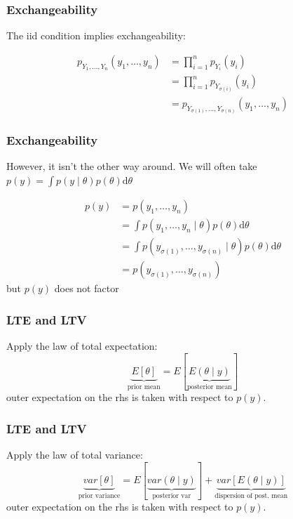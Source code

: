\documentclass{beamer}
\begin{document}
\begin{frame}
\frametitle{Exchangeability}

The iid condition implies exchangeability:

\begin{align*}
p_{Y_1, \ldots, Y_n}(y_1, \ldots, y_n) &= \prod_{i=1}^n p_{Y_i}(y_i) \tag{indep.} \\
&= \prod_{i=1}^n p_{Y_{\sigma(i)}}(y_i) \tag{ident.} \\
&= p_{Y_{\sigma(1)}, \ldots, Y_{\sigma(n)}}(y_1, \ldots, y_n)
\end{align*}

\end{frame}


\begin{frame}
\frametitle{Exchangeability}

However, it isn't the other way around. We will often take $p(y) = \int p(y \mid \theta) p(\theta) \text{d}\theta$

\begin{align*}
p(y) &= p(y_1, \ldots, y_n) \\
&= \int p(y_1, \ldots, y_n \mid \theta) p(\theta) \text{d}\theta \\
&= \int p(y_{\sigma(1)}, \ldots, y_{\sigma(n)} \mid \theta) p(\theta) \text{d}\theta \\
&= p(y_{\sigma(1)}, \ldots, y_{\sigma(n)})
\end{align*}
 but $p(y)$ does not factor

\end{frame}

\begin{frame}
\frametitle{LTE and LTV}

Apply the law of total expectation:
\[
\underbrace{E[\theta]}_{\text{prior mean}} = E[\underbrace{E(\theta \mid y)}_{\text{posterior mean}}]
\]
outer expectation on the rhs is taken with respect to $p(y)$.

\end{frame}


\begin{frame}
\frametitle{LTE and LTV}

Apply the law of total variance:
\[
\underbrace{var[\theta]}_{\text{prior variance}} = E[\underbrace{var(\theta \mid y)}_{\text{posterior var}}] + \underbrace{var[E(\theta \mid y)]}_{\text{dispersion of post. mean}}
\]
outer expectation on the rhs is taken with respect to $p(y)$.

\end{frame}
\end{document}
